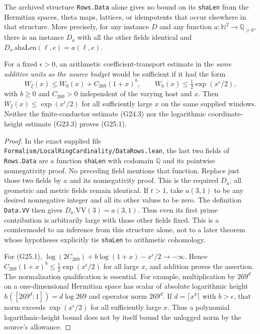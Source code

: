\begin{proposition}
\label{AC-G25}
The archived structure \texttt{Rows.Data} alone gives no bound on
its \texttt{shaLen} from the Hermitian spaces, theta maps, lattices,
or idempotents that occur elsewhere in that structure.  More
precisely, for any instance $D$ and any function
$a:\mathbb N^2\to\mathbb Q_{\geq0}$, there is an instance $D_a$
with all the other fields identical and
$D_a.\mathrm{shaLen}(\ell,e)=a(\ell,e)$.

For a fixed $\epsilon>0$, an arithmetic coefficient-transport
estimate in the \emph{same additive units as the source budget}
would be sufficient if it had the form
\[
 W_\xi(x)\leq W_0(x)+C_{269}(1+x)^b,\qquad
 W_0(x)\leq\tfrac12\exp(x^\epsilon/2),                \tag{G25.1}
\]
with $b\geq0$ and $C_{269}>0$ independent of the varying host
and $x$.
Then $W_\xi(x)\leq\exp(x^\epsilon/2)$ for all sufficiently
large $x$ on the same supplied windows.
Neither the finite-conductor estimate (G24.3) nor the logarithmic
coordinate-height estimate (G23.3) proves (G25.1).
\end{proposition}
\begin{proof}
In the exact supplied file
\texttt{Formalism/LocalRingCardinality/DataRows.lean}, the last
two fields of \texttt{Rows.Data} are a function
\texttt{shaLen} with codomain $\mathbb Q$ and its pointwise
nonnegativity proof.  No preceding field mentions that function.
Replace just those two fields by $a$ and its nonnegativity proof.
This is the required $D_a$; all geometric and metric fields remain
identical.  If $t>1$, take $a(3,1)$ to be any desired nonnegative
integer and all its other values to be zero.  The definition
\texttt{Data.VV} then gives $D_a.\mathrm{VV}(3)=a(3,1)$.
Thus even its first prime contribution is arbitrarily large with
those other fields fixed.  This is a countermodel to an inference
from this structure alone, not to a later theorem whose hypotheses
explicitly tie \texttt{shaLen} to arithmetic cohomology.

For (G25.1),
$\log(2C_{269})+b\log(1+x)-x^\epsilon/2\to-\infty$.
Hence $C_{269}(1+x)^b\leq\tfrac12\exp(x^\epsilon/2)$
for all large $x$, and addition proves the assertion.
The normalization qualification is essential.  For example,
multiplication by $269^d$ on a one-dimensional Hermitian space
has scalar of absolute logarithmic height
$h([269^d:1])=d\log269$ and operator norm $269^d$.
If $d=\lceil x^b\rceil$ with $b>\epsilon$, that norm exceeds
$\exp(x^\epsilon/2)$ for all sufficiently large $x$.
Thus a polynomial logarithmic-height bound does not by itself
bound the unlogged norm by the source's allowance.
\end{proof}

